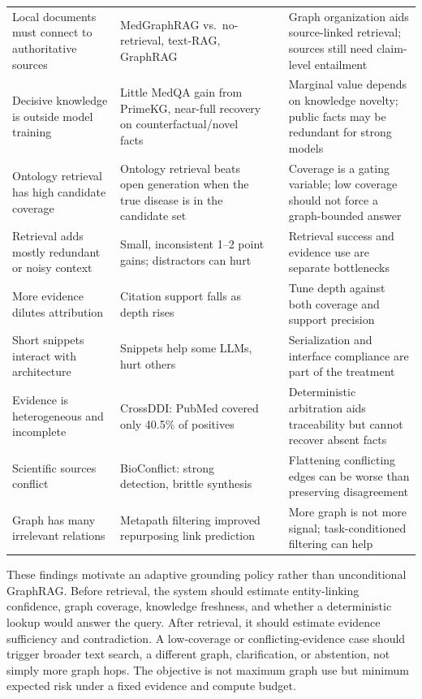 \begin{table}[!t]
\begin{tabularx}{\textwidth}{@{}L{4.0cm} Y >{\raggedright\arraybackslash}p{1.05cm} Y@{}}
Local documents must connect to authoritative sources & MedGraphRAG vs.\ no-retrieval, text-RAG, GraphRAG~\cite{wu2025medgraphrag} &  & Graph organization aids source-linked retrieval; sources still need claim-level entailment \\
Decisive knowledge is outside model training & Little MedQA gain from PrimeKG, near-full recovery on counterfactual/novel facts~\cite{mandarapu2026controlled} &  & Marginal value depends on knowledge novelty; public facts may be redundant for strong models \\
Ontology retrieval has high candidate coverage & Ontology retrieval beats open generation when the true disease is in the candidate set~\cite{elmofty2026ontology} &  & Coverage is a gating variable; low coverage should not force a graph-bounded answer \\
Retrieval adds mostly redundant or noisy context & Small, inconsistent 1--2 point gains; distractors can hurt~\cite{nourbakhsh2026retrieval} &  & Retrieval success and evidence use are separate bottlenecks \\
More evidence dilutes attribution & Citation support falls as depth rises~\cite{ma2026vericite} &  & Tune depth against both coverage and support precision \\
Short snippets interact with architecture & Snippets help some LLMs, hurt others~\cite{liu2026mhgraphbench} &  & Serialization and interface compliance are part of the treatment \\
Evidence is heterogeneous and incomplete & CrossDDI: PubMed covered only 40.5\% of positives~\cite{wang2026crossddi} &  & Deterministic arbitration aids traceability but cannot recover absent facts \\
Scientific sources conflict & BioConflict: strong detection, brittle synthesis~\cite{kirubakaran2026bioconflict} &  & Flattening conflicting edges can be worse than preserving disagreement \\
Graph has many irrelevant relations & Metapath filtering improved repurposing link prediction~\cite{ratajczak2022metapath} &  & More graph is not more signal; task-conditioned filtering can help \\
\bottomrule
\end{tabularx}
\end{table}

These findings motivate an adaptive grounding policy rather than unconditional GraphRAG. Before retrieval, the system should estimate entity-linking confidence, graph coverage, knowledge freshness, and whether a deterministic lookup would answer the query. After retrieval, it should estimate evidence sufficiency and contradiction. A low-coverage or conflicting-evidence case should trigger broader text search, a different graph, clarification, or abstention, not simply more graph hops. The objective is not maximum graph use but minimum expected risk under a fixed evidence and compute budget.

